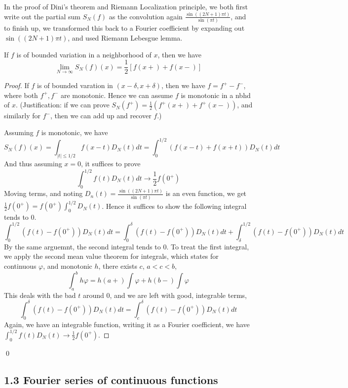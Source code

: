 \begin{remark}
    In the proof of Dini's theorem and Riemann Localization principle, we both first write out the partial sum $S_N(f)$ as the convolution again $\frac{\sin((2N+1)\pi t)}{\sin(\pi t)}$, and to finish up, we transformed this back to a Fourier coefficient by expanding out $\sin((2N+1)\pi t)$, and used Riemann Lebesgue lemma.
\end{remark}

\begin{theorem}
    If $f$ is of bounded variation in a neighborhood of $x$, then we have
    \begin{equation*}
        \lim_{N\to\infty}S_N(f)(x)=\frac{1}{2}[f(x+)+f(x-)]
    \end{equation*}
\end{theorem}
\begin{proof}
    If $f$ is of bounded varation in $(x-\delta, x+\delta)$, then we have $f=f^+-f^-$, where both $f^+, f^-$ are monotonic. Hence we can assume $f$ is monotonic in a nbhd of $x$. (Justification: if we can prove $S_N(f^+)=\frac{1}{2}(f^+(x+)+f^+(x-))$, and similarly for $f^-$, then we can add up and recover $f$.)

    Assuming $f$ is monotonic, we have
    \begin{equation*}
        S_N(f)(x)=\int_{|t|\leq1/2}f(x-t)D_N(t)dt=\int_0^{1/2}\left(f(x-t)+f(x+t) \right)D_N(t)dt
    \end{equation*}
    And thus assuming $x=0$, it suffices to prove
    \begin{equation*}
        \int_0^{1/2}f(t)D_N(t)dt\to\frac{1}{2}f(0^+)
    \end{equation*}
    Moving terms, and noting $D_n(t)=\frac{\sin((2N+1)\pi t)}{\sin(\pi t)}$ is an even function, we get $\frac{1}{2}f(0^+)=f(0^+)\int_0^{1/2}D_N(t)$. Hence it suffices to show the following integral tends to 0.
    \begin{equation*}
        \int_0^{1/2}(f(t)-f(0^+))D_N(t)dt=\int_0^\delta(f(t)-f(0^+))D_N(t)dt+\int_\delta^{1/2}(f(t)-f(0^+))D_N(t)dt
    \end{equation*}
    By the same arguemnt, the second integral tends to 0. To treat the first integral, we apply the second mean value theorem for integrals, which states for continuous $\varphi$, and monotonic $h$, there exists $c$, $a<c<b$, 
    \begin{equation*}
        \int_a^b h\varphi=h(a+)\int\varphi+h(b-)\int\varphi
    \end{equation*}
    This deals with the bad $t$ around 0, and we are left with good, integrable terms,
    \begin{equation*}
        \int_0^\delta(f(t)-f(0^+))D_N(t)dt=\int_c^\delta(f(t)-f(0^+))D_N(t)dt
    \end{equation*}
    Again, we have an integrable function, writing it as a Fourier coefficient, we have $\int_0^{1/2}f(t)D_N(t)\to\frac{1}{2}f(0^+)$.
\end{proof}
\qed

\subsection{1.3 Fourier series of continuous functions}

